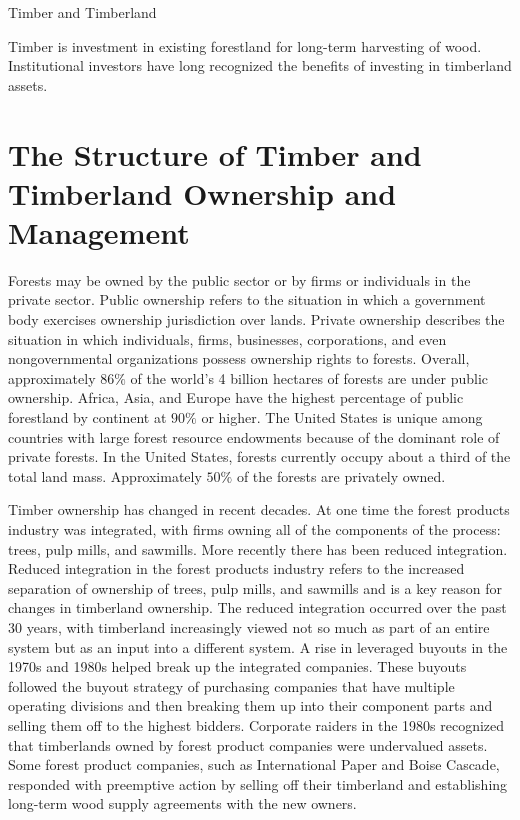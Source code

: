 \documentclass[11pt]{article}
\begin{document}
Timber and Timberland

Timber is investment in existing forestland for long-term harvesting of wood. Institutional investors have long recognized the benefits of investing in timberland assets.

\section*{The Structure of Timber and Timberland Ownership and Management}
Forests may be owned by the public sector or by firms or individuals in the private sector. Public ownership refers to the situation in which a government body exercises ownership jurisdiction over lands. Private ownership describes the situation in which individuals, firms, businesses, corporations, and even nongovernmental organizations possess ownership rights to forests. Overall, approximately $86 \%$ of the world's 4 billion hectares of forests are under public ownership. Africa, Asia, and Europe have the highest percentage of public forestland by continent at $90 \%$ or higher. The United States is unique among countries with large forest resource endowments because of the dominant role of private forests. In the United States, forests currently occupy about a third of the total land mass. Approximately $50 \%$ of the forests are privately owned.

Timber ownership has changed in recent decades. At one time the forest products industry was integrated, with firms owning all of the components of the process: trees, pulp mills, and sawmills. More recently there has been reduced integration. Reduced integration in the forest products industry refers to the increased separation of ownership of trees, pulp mills, and sawmills and is a key reason for changes in timberland ownership. The reduced integration occurred over the past 30 years, with timberland increasingly viewed not so much as part of an entire system but as an input into a different system. A rise in leveraged buyouts in the 1970s and 1980s helped break up the integrated companies. These buyouts followed the buyout strategy of purchasing companies that have multiple operating divisions and then breaking them up into their component parts and selling them off to the highest bidders. Corporate raiders in the 1980s recognized that timberlands owned by forest product companies were undervalued assets. Some forest product companies, such as International Paper and Boise Cascade, responded with preemptive action by selling off their timberland and establishing long-term wood supply agreements with the new owners.
\end{document}
